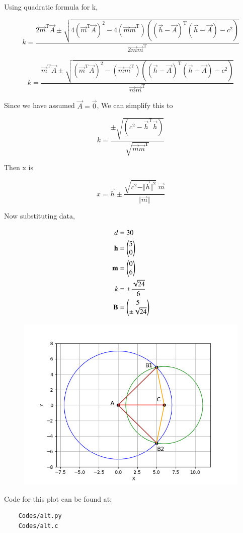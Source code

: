 \documentclass[journal]{IEEEtran}
\begin{document}
Using quadratic formula for k,

$$k = \frac{2\vec{m}^\text{T}\vec{A} \pm \sqrt{4(\vec{m}^\text{T}\vec{A})^2 - 4 (\vec{m}\vec{m}^\text{T})((\vec{h} - \vec{A})^\text{T}(\vec{h} - \vec{A}) - c^2)}}{2\vec{m}\vec{m}^\text{T}}$$

$$k = \frac{\vec{m}^\text{T}\vec{A} \pm \sqrt{(\vec{m}^\text{T}\vec{A})^2 - (\vec{m}\vec{m}^\text{T})((\vec{h} - \vec{A})^\text{T}(\vec{h} - \vec{A}) - c^2)}}{\vec{m}\vec{m}^\text{T}}$$

Since we have assumed $\vec{A} = \vec{0}$, We can simplify this to

$$k = \frac{\pm \sqrt{(c^2 - \vec{h}^\text{T}\vec{h})}}{\sqrt{\vec{m}\vec{m}^\text{T}}}$$

Then x is

$$x = \vec{h} \pm \frac{\sqrt{c^2 - \Vert \vec{h} \Vert^2} \; \vec{m}}{\Vert \vec{m} \Vert}$$

Now substituting data,

\begin{align*}
	d &= 30\\
	\mathbf{h} &= \begin{pmatrix}5 \\ 0\end{pmatrix}\\
	\mathbf{m} &= \begin{pmatrix}0 \\ 6\end{pmatrix}\\
	k &= \pm \frac{\sqrt{24}}{6}\\
	\mathbf{B} &= \begin{pmatrix}5 \\ \pm \sqrt{24}\end{pmatrix}
\end{align*}

\begin{figure}[H]
	\centering
	\includegraphics[width=0.75\columnwidth]{Figures/Alt_Figure.png}
	\label{fig}
\end{figure}

Code for this plot can be found at:
\begin{lstlisting}
    Codes/alt.py
    Codes/alt.c
\end{lstlisting}
\end{document}
